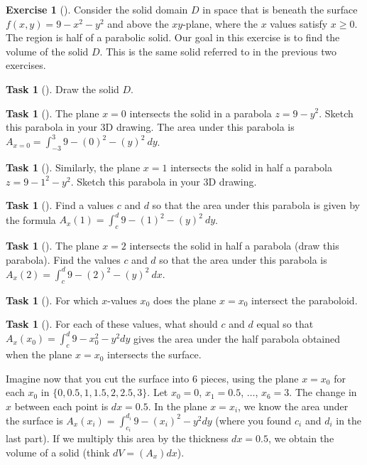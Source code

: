 \documentclass[10pt,]{book}
\theoremstyle{plain}
\theoremstyle{definition}
\theoremstyle{definition}
\theoremstyle{definition}
\theoremstyle{definition}
\newtheorem{exploration}[project]{Exercise}
\newtheorem{task}[project]{Task}
\theoremstyle{definition}
\numberwithin{equation}{section}
\begin{document}
\begin{exploration}[]\label{exploration-250}
Consider the solid domain \(D\) in space that is beneath the surface \(f(x,y)=9-x^2-y^2\) and above the \(xy\)-plane, where the \(x\) values satisfy \(x\geq 0\). The region is half of a parabolic solid. Our goal in this exercise is to find the volume of the solid \(D\). This is the same solid referred to in the previous two exercises.%
\begin{task}[]\label{task-671}
Draw the solid \(D\).%
\end{task}
\begin{task}[]\label{task-672}
The plane \(x=0\) intersects the solid in a parabola \(z=9-y^2\). Sketch this parabola in your 3D drawing. The area under this parabola is \(A_{x=0} = \int_{-3}^3 9-(0)^2-(y)^2 \ dy\).%
\end{task}
\begin{task}[]\label{task-673}
Similarly, the plane \(x=1\) intersects the solid in half a parabola \(z=9-1^2-y^2\). Sketch this parabola in your 3D drawing.%
\begin{task}[]\label{task-674}
Find a values \(c\) and \(d\) so that the area under this parabola is given by the formula \(A_x(1)=\int_c^{d} 9-(1)^2-(y)^2 \ dy\).%
\end{task}
\end{task}
\begin{task}[]\label{task-675}
The plane \(x=2\) intersects the solid in half a parabola (draw this parabola). Find the values \(c\) and \(d\) so that the area under this parabola is \(A_x(2)=\int_c^d 9-(2)^2-(y)^2 \ dx\).%
\end{task}
\begin{task}[]\label{task-676}
For which \(x\)-values \(x_0\) does the plane \(x=x_0\) intersect the paraboloid.%
\end{task}
\begin{task}[]\label{task-677}
For each of these values, what should \(c\) and \(d\) equal so that \(A_x(x_0) = \int_c^d 9-x_0^2-y^2 dy\) gives the area under the half parabola obtained when the plane \(x=x_0\) intersects the surface.%
\end{task}
Imagine now that you cut the surface into 6 pieces, using the plane \(x=x_0\) for each \(x_0\) in \(\{0,0.5,1,1.5,2, 2.5,3\}\). Let \(x_0=0\), \(x_1=0.5\), \(\ldots\), \(x_{6}=3\). The change in \(x\) between each point is \(dx=0.5\). In the plane \(x=x_i\), we know the area under the surface is \(A_x(x_i) = \int_{c_i}^{d_i} 9-(x_i)^2-y^2 dy\) (where you found \(c_i\) and \(d_i\) in the last part). If we multiply this area by the thickness \(dx=0.5\), we obtain the volume of a solid (think \(dV=(A_x)dx\)).%

\end{exploration}
\end{document}
